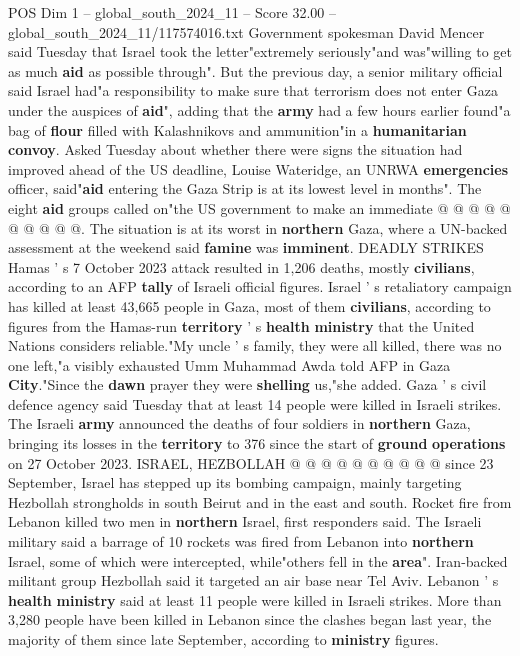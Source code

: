 \begin{textsample}{POS Dim 1 – global\_south\_2024\_11 – Score 32.00 – global\_south\_2024\_11/117574016.txt}
Government spokesman David Mencer said Tuesday that Israel took the letter"extremely seriously"and was"willing to get as much \textbf{aid} as possible through".
But the previous day, a senior military official said Israel had"a responsibility to make sure that terrorism does not enter Gaza under the auspices of \textbf{aid}", adding that the \textbf{army} had a few hours earlier found"a bag of \textbf{flour} filled with Kalashnikovs and ammunition"in a \textbf{humanitarian} \textbf{convoy}.
Asked Tuesday about whether there were signs the situation had improved ahead of the US deadline, Louise Wateridge, an UNRWA \textbf{emergencies} officer, said"\textbf{aid} entering the Gaza Strip is at its lowest level in months".
The eight \textbf{aid} groups called on"the US government to make an immediate @ @ @ @ @ @ @ @ @ @.
The situation is at its worst in \textbf{northern} Gaza, where a UN-backed assessment at the weekend said \textbf{famine} was \textbf{imminent}.
DEADLY STRIKES Hamas ' s 7 October 2023 attack resulted in 1,206 deaths, mostly \textbf{civilians}, according to an AFP \textbf{tally} of Israeli official figures.
Israel ' s retaliatory campaign has killed at least 43,665 people in Gaza, most of them \textbf{civilians}, according to figures from the Hamas-run \textbf{territory} ' s \textbf{health} \textbf{ministry} that the United Nations considers reliable."My uncle ' s family, they were all killed, there was no one left,"a visibly exhausted Umm Muhammad Awda told AFP in Gaza \textbf{City}."Since the \textbf{dawn} prayer they were \textbf{shelling} us,"she added.
Gaza ' s civil defence agency said Tuesday that at least 14 people were killed in Israeli strikes.
The Israeli \textbf{army} announced the deaths of four soldiers in \textbf{northern} Gaza, bringing its losses in the \textbf{territory} to 376 since the start of \textbf{ground} \textbf{operations} on 27 October 2023.
ISRAEL, HEZBOLLAH @ @ @ @ @ @ @ @ @ @ since 23 September, Israel has stepped up its bombing campaign, mainly targeting Hezbollah strongholds in south Beirut and in the east and south.
Rocket fire from Lebanon killed two men in \textbf{northern} Israel, first responders said.
The Israeli military said a barrage of 10 rockets was fired from Lebanon into \textbf{northern} Israel, some of which were intercepted, while"others fell in the \textbf{area}".
Iran-backed militant group Hezbollah said it targeted an air base near Tel Aviv.
Lebanon ' s \textbf{health} \textbf{ministry} said at least 11 people were killed in Israeli strikes.
More than 3,280 people have been killed in Lebanon since the clashes began last year, the majority of them since late September, according to \textbf{ministry} figures.

\end{textsample}

